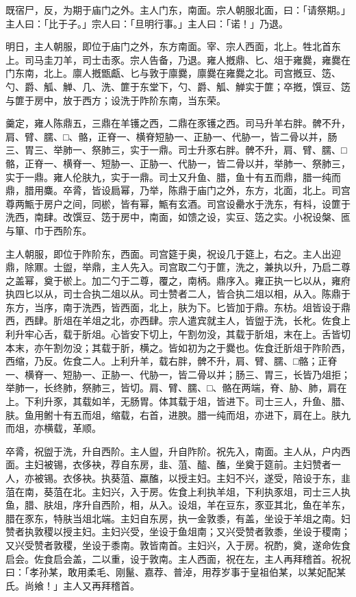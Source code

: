 \documentclass[]{article}
\begin{document}
既宿尸，反，为期于庙门之外。主人门东，南面。宗人朝服北面，曰：「请祭期。」主人曰：「比于子。」宗人曰：「旦明行事。」主人曰：「诺！」乃退。

明日，主人朝服，即位于庙门之外，东方南面。宰、宗人西面，北上。牲北首东上。司马圭刀羊，司士击豕。宗人告备，乃退。雍人摡鼎、匕、俎于雍爨，雍爨在门东南，北上。廪人摡甑甗、匕与敦于廪爨，廪爨在雍爨之北。司宫摡豆、笾、勺、爵、觚、觯、几、洗、篚于东堂下，勺、爵、觚、觯实于篚；卒摡，馔豆、笾与篚于房中，放于西方；设洗于阼阶东南，当东荣。

羹定，雍人陈鼎五，三鼎在羊镬之西，二鼎在豕镬之西。司马升羊右胖。髀不升，肩、臂、臑、□、骼，正脊一、横脊短胁一、正胁一、代胁一，皆二骨以并，肠三、胃三、举肺一、祭肺三，实于一鼎。司士升豕右胖。髀不升，肩、臂、臑、□骼，正脊一、横脊一、短胁一、正胁一、代胁一，皆二骨以并，举肺一、祭肺三，实于一鼎。雍人伦肤九，实于一鼎。司士又升鱼、腊，鱼十有五而鼎，腊一纯而鼎，腊用麋。卒脀，皆设扃幂，乃举，陈鼎于庙门之外，东方，北面，北上。司宫尊两甒于房户之间，同棜，皆有幂，甒有玄酒。司宫设罍水于洗东，有枓，设篚于洗西，南肆。改馔豆、笾于房中，南面，如馈之设，实豆、笾之实。小祝设槃、匜与箪、巾于西阶东。

主人朝服，即位于阼阶东，西面。司宫筵于奥，祝设几于筵上，右之。主人出迎鼎，除鼏。士盥，举鼎，主人先入。司宫取二勺于篚，洗之，兼执以升，乃启二尊之盖幂，奠于棜上。加二勺于二尊，覆之，南柄。鼎序入。雍正执一匕以从，雍府执四匕以从，司士合执二俎以从。司士赞者二人，皆合执二俎以相，从入。陈鼎于东方，当序，南于洗西，皆西面，北上，肤为下。匕皆加于鼎。东枋。俎皆设于鼎西，西肆。肵俎在羊俎之北，亦西肆。宗人遣宾就主人，皆盥于洗，长朼。佐食上利升牢心舌，载于肵俎。心皆安下切上，午割勿没，其载于肵俎，末在上。舌皆切本末，亦午割勿没；其载于肵，横之。皆如初为之于爨也。佐食迁肵俎于阼阶西，西缩，乃反。佐食二人。上利升羊，载右胖，髀不升，肩、臂、臑、□骼；正脊一、横脊一、短胁一、正胁一、代胁一，皆二骨以并；肠三、胃三，长皆乃俎拒；举肺一，长终肺，祭肺三，皆切。肩、臂、臑、□、骼在两端，脊、胁、肺，肩在上。下利升豕，其载如羊，无肠胃。体其载于俎，皆进下。司士三人，升鱼、腊、肤。鱼用鲋十有五而俎，缩载，右首，进腴。腊一纯而俎，亦进下，肩在上。肤九而俎，亦横载，革顺。

卒脀，祝盥于洗，升自西阶。主人盥，升自阼阶。祝先入，南面。主人从，户内西面。主妇被锡，衣侈袂，荐自东房，韭、菹、醓、醢，坐奠于筵前。主妇赞者一人，亦被锡。衣侈袂。执葵菹、蠃醢，以授主妇。主妇不兴，遂受，陪设于东，韭菹在南，葵菹在北。主妇兴，入于房。佐食上利执羊俎，下利执豕俎，司士三人执鱼，腊、肤俎，序升自西阶，相，从入。设俎，羊在豆东，豕亚其北，鱼在羊东，腊在豕东，特肤当俎北端。主妇自东房，执一金敦黍，有盖，坐设于羊俎之南。妇赞者执敦稷以授主妇。主妇兴受，坐设于鱼俎南；又兴受赞者敦黍，坐设于稷南；又兴受赞者敦稷，坐设于黍南。敦皆南首。主妇兴，入于房。祝酌，奠，遂命佐食启会。佐食启会盖，二以重，设于敦南。主人西面，祝在左，主人再拜稽首。祝祝曰：「孝孙某，敢用柔毛、刚鬣、嘉荐、普淖，用荐岁事于皇祖伯某，以某妃配某氏。尚飨！」主人又再拜稽首。
\end{document}
